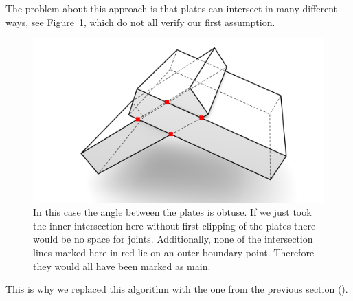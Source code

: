 \documentclass[../ClassicThesis.tex]{subfiles}
\begin{document}
The problem about this approach is that plates can intersect in many different ways, see Figure~\ref{fig:obtuseAssumption}, which do not all verify our first assumption. 
\begin{figure}[!ht]
\centering
\includegraphics[width=\columnwidth]{Images/Blocks_obtuse_overintersect.png}
\caption{In this case the angle between the plates is obtuse. If we just took the inner intersection here without first clipping of the plates there would be no space for joints. Additionally, none of the intersection lines marked here in red lie on an outer boundary point. Therefore they would all have been marked as main. }
\label{fig:obtuseAssumption}
\end{figure}
This is why we replaced this algorithm with the one from the previous section ().
\end{document}
